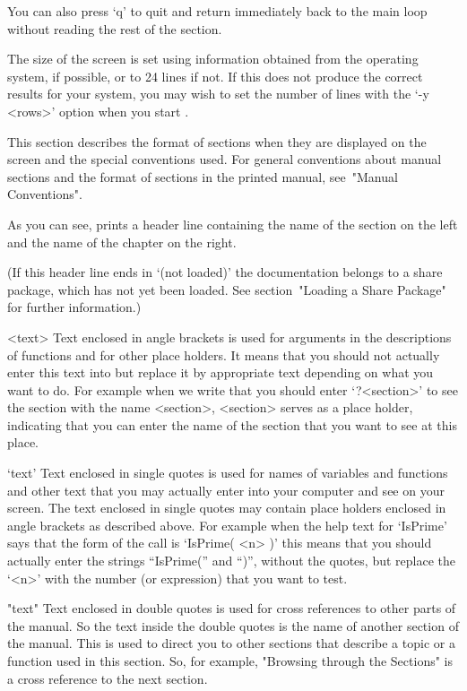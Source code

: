 You can also press `q' to quit and return immediately back to the main
{\GAP} loop without reading the rest of the section.

The size of the screen is set using information obtained from the
operating system, if possible, or to 24 lines if not.  If this does
not produce the correct results for your system, you may wish to set
the number of lines with the `-y <rows>' option when you start {\GAP}.


This section describes the format of sections when they are displayed on
the screen and the special conventions used.
For general conventions about manual sections and the format of sections
in the printed manual, see~"Manual Conventions".

As you can see, {\GAP} prints a header line
containing the name of the section on the left and the name of the
chapter on the right.

(If this header line ends in `(not loaded)' the documentation belongs to a
share package, which has not yet been loaded. See section~"Loading a Share
Package" for further information.)

\begintt
<text>
\endtt
Text enclosed in angle brackets is used for arguments in the descriptions
of functions and for other place holders. It means that you should not
actually enter this text into {\GAP} but replace it by appropriate
text depending on what you want to do. For example when we write that
you should enter `?<section>' to see the section with the name <section>,
<section> serves as a place holder, indicating that you can enter the
name of the section that you want to see at this place.

\begintt
`text'
\endtt
Text enclosed in single quotes is used for names of variables and
functions and other text that you may actually enter into your computer
and see on your screen. The text enclosed in single quotes may contain
place holders enclosed in angle brackets as described above. For example
when the help text for `IsPrime' says that the form of the call is
`IsPrime( <n> )' this means that you should actually
enter the strings ``IsPrime('' and ``)'', without the quotes,
but replace the `<n>' with the number (or expression)
that you want to test.

\begintt
"text"
\endtt
Text enclosed in double quotes is used for cross references to other
parts of the manual. So the text inside the double quotes is the name of
another section of the manual. This is used to direct you to other
sections that describe a topic or a function used in this section. So, 
for example, "Browsing through the Sections" is a cross reference to the next
section.

